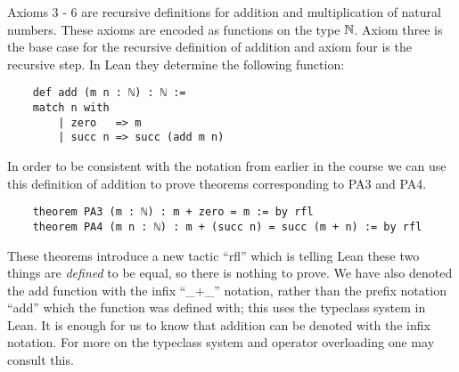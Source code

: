 \documentclass{book}
\begin{document}
Axioms 3 - 6 are recursive definitions for addition and multiplication of natural numbers. These axioms are encoded as functions on the type $\mathbb{N}$. Axiom three is the base case for the recursive definition of addition and axiom four is the recursive step. In Lean they determine the following function: 

\begin{center}
    \begin{lstlisting}
    def add (m n : ℕ) : ℕ :=
    match n with
        | zero   => m
        | succ n => succ (add m n)
    \end{lstlisting}
\end{center}

In order to be consistent with the notation from earlier in the course we can use this definition of addition to prove theorems corresponding to PA3 and PA4. 

\begin{center}
    \begin{lstlisting}
    theorem PA3 (m : ℕ) : m + zero = m := by rfl
    theorem PA4 (m n : ℕ) : m + (succ n) = succ (m + n) := by rfl
    \end{lstlisting}
\end{center}

These theorems introduce a new tactic ``rfl'' which is telling Lean these two things are \emph{defined} to be equal, so there is nothing to prove. We have also denoted the add function with the infix ``\_+\_'' notation, rather than the prefix notation ``add'' which the function was defined with; this uses the typeclass system in Lean. It is enough for us to know that addition can be denoted with the infix notation. For more on the typeclass system and operator overloading one may consult this.
\end{document}
